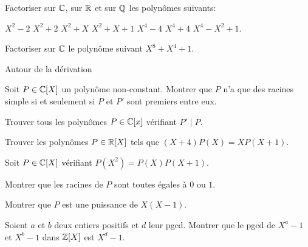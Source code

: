 \documentclass[french]{report}
\begin{document}
\begin{exo}
    Factoriser sur \(\mathbb{C}\), sur \(\mathbb{R}\)  et sur \(\mathbb{Q}\) les polynômes suivants:
    \begin{enumerate}
        \itt \(X^2-2\)
        \itt \(X^2+2\)
        \itt \(X^2+X\)
        \itt \(X^2+X+1\)
        \itt \(X^4-4\)
        \itt \(X^4+4\)
        \itt \(X^4-X^2+1\).
    \end{enumerate}
\end{exo}

\begin{exo}
    Factoriser sur \(\mathbb{C}\) le polynôme suivant \(X^8+X^4+1\).
\end{exo}

\begin{exo} Autour de la dérivation
    \begin{q}{1}
        Soit \(P\in\mathbb{C}[X]\) un polynôme non-constant. Montrer que \(P\) n'a que des racines
        simple si et seulement si \(P\) et \(P'\) sont premiers entre eux.
    \end{q}
    \begin{q}{2}
        Trouver tous les polynômes \(P\in \mathbb{C}[x]\) vérifiant \(P'\mid P\).
    \end{q}
\end{exo}

\begin{exo}
    Trouver les polynômes \(P\in\mathbb{R}[X]\) tels que \(\left(X+4\right)P(X)=XP(X+1)\).
\end{exo}

\begin{exo}
    Soit \(P\in\mathbb{C}[X]\) vérifiant \(P(X^2) = P(X)P(X+1)\).
    \begin{q}{1}
        Montrer que les racines de \(P\) sont toutes égales à \(0\) ou \(1\).
    \end{q}
    \begin{q}{2}
        Montrer que \(P\) est une puissance de \(X(X-1)\).
    \end{q}
\end{exo}

\begin{exo}
    Soient \(a\) et \(b\) deux entiers positifs et \(d\) leur pgcd. Montrer que le
    pgcd de \(X^a-1\) et \(X^b-1\) dans \(\mathbb{Z}[X]\) est \(X^d-1\).
\end{exo}
\end{document}
